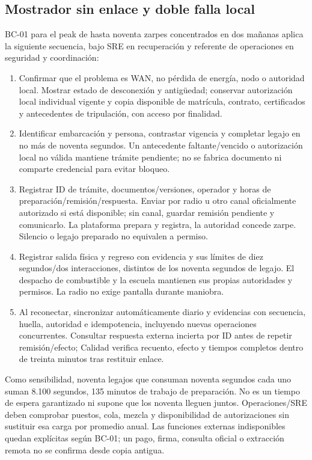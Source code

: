\subsection{Mostrador sin enlace y doble falla local}\label{sec:sd8-bcp-mostrador-p07}
BC-01 para el peak de hasta noventa zarpes concentrados en dos mañanas aplica la siguiente secuencia, bajo SRE en recuperación y referente de operaciones en seguridad y coordinación:
\begin{enumerate}
\item Confirmar que el problema es WAN, no pérdida de energía, nodo o autoridad local. Mostrar estado de desconexión y antigüedad; conservar autorización local individual vigente y copia disponible de matrícula, contrato, certificados y antecedentes de tripulación, con acceso por finalidad.
\item Identificar embarcación y persona, contrastar vigencia y completar legajo en no más de noventa segundos. Un antecedente faltante/vencido o autorización local no válida mantiene trámite pendiente; no se fabrica documento ni comparte credencial para evitar bloqueo.
\item Registrar ID de trámite, documentos/versiones, operador y horas de preparación/remisión/respuesta. Enviar por radio u otro canal oficialmente autorizado si está disponible; sin canal, guardar remisión pendiente y comunicarlo. La plataforma prepara y registra, la autoridad concede zarpe. Silencio o legajo preparado no equivalen a permiso.
\item Registrar salida física y regreso con evidencia y sus límites de diez segundos/dos interacciones, distintos de los noventa segundos de legajo. El despacho de combustible y la escuela mantienen sus propias autoridades y permisos. La radio no exige pantalla durante maniobra.
\item Al reconectar, sincronizar automáticamente diario y evidencias con secuencia, huella, autoridad e idempotencia, incluyendo nuevas operaciones concurrentes. Consultar respuesta externa incierta por ID antes de repetir remisión/efecto; Calidad verifica recuento, efecto y tiempos completos dentro de treinta minutos tras restituir enlace.
\end{enumerate}
Como sensibilidad, noventa legajos que consuman noventa segundos cada uno suman 8.100 segundos, 135 minutos de trabajo de preparación. No es un tiempo de espera garantizado ni supone que los noventa lleguen juntos. Operaciones/SRE deben comprobar puestos, cola, mezcla y disponibilidad de autorizaciones sin sustituir esa carga por promedio anual. Las funciones externas indisponibles quedan explícitas según BC-01; un pago, firma, consulta oficial o extracción remota no se confirma desde copia antigua. \parencite[14.1; RT-09.01; decisión 21]{sd8-c07}

